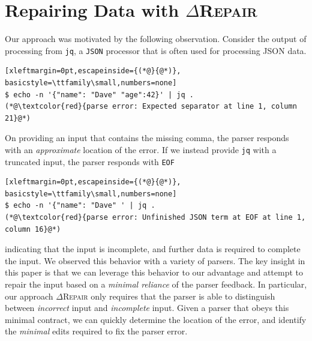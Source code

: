 \documentclass[sigconf,review,anonymous]{acmart}
\newcommand{\approach}{\textsc{$\Delta$Repair}\xspace}
\newcommand{\drepair}{\approach}
\def\<#1>{\texttt{#1}}
\begin{document}
\section{Repairing Data with \drepair}
\label{sec:drepair}
Our approach was motivated by the following observation.
Consider the output of processing
from \<jq>, a \<JSON> processor that is often used for processing JSON data.
\begin{lstlisting}[xleftmargin=0pt,escapeinside={(*@}{@*)}, basicstyle=\ttfamily\small,numbers=none]
$ echo -n '{"name": "Dave" "age":42}' | jq .
(*@\textcolor{red}{parse error: Expected separator at line 1, column 21}@*)
\end{lstlisting}
On providing an input that contains the missing comma, the parser responds with an
\emph{approximate} location of the error.
If we instead provide \<jq> with a truncated input,
the parser responds with \<EOF> 
\begin{lstlisting}[xleftmargin=0pt,escapeinside={(*@}{@*)}, basicstyle=\ttfamily\small,numbers=none]
$ echo -n '{"name": "Dave" ' | jq .
(*@\textcolor{red}{parse error: Unfinished JSON term at EOF at line 1, column 16}@*)
\end{lstlisting}
indicating that the
input is incomplete,
and further data is required to complete the input. We observed this behavior with a variety of
parsers.
The key insight in this paper is that we can leverage this behavior to our advantage and
attempt to repair the input based on a \emph{minimal reliance} of the parser feedback.
In particular, our approach \drepair only requires that the parser is able to distinguish
between \emph{incorrect} input and \emph{incomplete} input. Given a parser that obeys this
minimal contract, we can quickly determine the location of the error, and identify the
\emph{minimal} edits required to fix the parser error.
\end{document}
